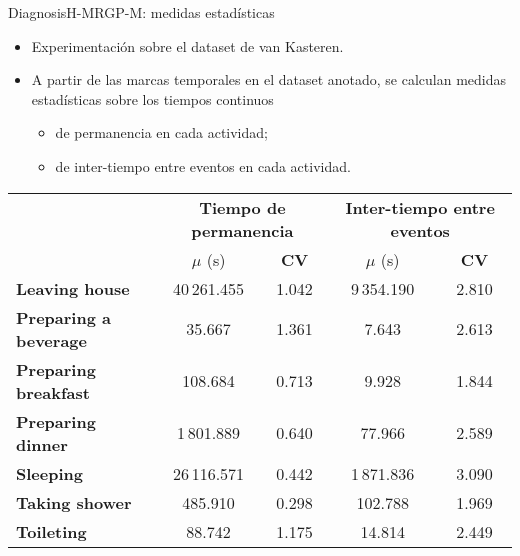 \documentclass[9pt, handout]{beamer}
\begin{document}
      \begin{frame}{Diagnosis}{H-MRGP-M: medidas estadísticas}
        \pause
        \begin{itemize}
          \item Experimentación sobre el dataset de van Kasteren.
          \pause
          \item A partir de las marcas temporales en el dataset anotado, se calculan medidas estadísticas sobre los tiempos continuos
          \begin{itemize}
            \item de permanencia en cada actividad;
            \item de inter-tiempo entre eventos en cada actividad.
          \end{itemize}
        \end{itemize}
        
        \pause
    		\begin{table}[h!]
    			\centering
    			\small
    			\setlength{\tabcolsep}{5pt}
    			\def\arraystretch{0.75}
    			\begin{tabular}{| l | c | c || c | c |}
    				\hline
    				& \multicolumn{2}{|c||}{\bf Tiempo de permanencia}& \multicolumn{2}{|c|}{\bf Inter-tiempo entre eventos}\\
    				\cline{2-5}
    				& $\mu$ (s) & {\bf CV} & $\mu$ (s) & {\bf CV}\\
    				\hline
    				{\bf Leaving house} & 40\,261.455 & 1.042 & 9\,354.190 & 2.810 \\ \hline
    				{\bf Preparing a beverage} &  35.667 & 1.361 & 7.643 & 2.613\\ \hline
    				{\bf Preparing breakfast} &  108.684 & 0.713 & 9.928 & 1.844\\ \hline
    				{\bf Preparing dinner} &  1\,801.889 & 0.640 & 77.966 & 2.589\\ \hline
    				{\bf Sleeping} &  26\,116.571 & 0.442 & 1\,871.836 & 3.090\\ \hline
    				{\bf Taking shower} &  485.910 & 0.298 & 102.788 & 1.969\\ \hline
    				{\bf Toileting} &  88.742 & 1.175 & 14.814 & 2.449\\ 
    				\hline
      		\end{tabular}
    		\end{table}
      \end{frame}
      
\end{document}
